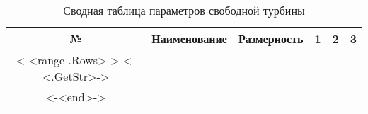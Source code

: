 \begin{center}
    \begin{longtable}{|c|c|c|c|c|c|}
        \hline
        \textbf{№} &
        \textbf{Наименование} &
        \textbf{Размерность} &
        \textbf{1} &
        \textbf{2} &
        \textbf{3} \\\hline
        \endhead
        <-<range .Rows>->
        <-<.GetStr>-> \\\hline
        <-<end>->
        \caption{Сводная таблица параметров свободной турбины} \label{tab:ft-stage-total}
    \end{longtable}
\end{center}